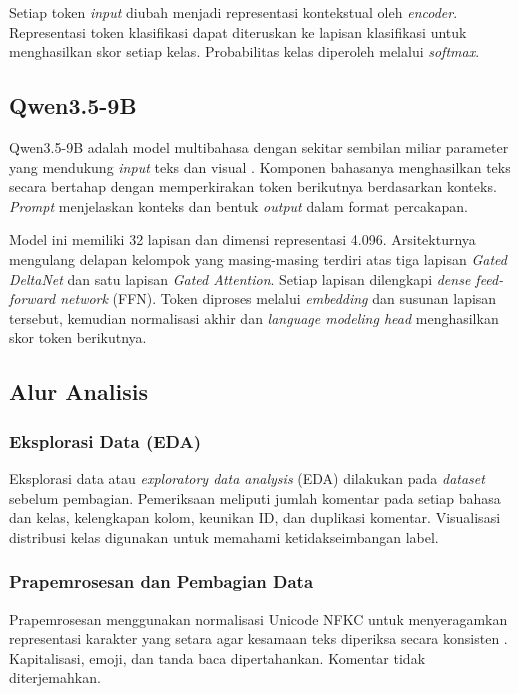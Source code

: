 \documentclass[11pt]{article}
\begin{document}
Setiap token \textit{input} diubah menjadi representasi kontekstual oleh \textit{encoder}. Representasi token klasifikasi dapat diteruskan ke lapisan klasifikasi untuk menghasilkan skor setiap kelas. Probabilitas kelas diperoleh melalui \textit{softmax}.

\subsection{Qwen3.5-9B}
\label{subsec:qwen}

Qwen3.5-9B adalah model multibahasa dengan sekitar sembilan miliar parameter yang mendukung \textit{input} teks dan visual \citep{qwen-team-2026-qwen35}. Komponen bahasanya menghasilkan teks secara bertahap dengan memperkirakan token berikutnya berdasarkan konteks. \textit{Prompt} menjelaskan konteks dan bentuk \textit{output} dalam format percakapan.

Model ini memiliki 32 lapisan dan dimensi representasi 4.096. Arsitekturnya mengulang delapan kelompok yang masing-masing terdiri atas tiga lapisan \textit{Gated DeltaNet} dan satu lapisan \textit{Gated Attention}. Setiap lapisan dilengkapi \textit{dense feed-forward network} (FFN). Token diproses melalui \textit{embedding} dan susunan lapisan tersebut, kemudian normalisasi akhir dan \textit{language modeling head} menghasilkan skor token berikutnya.

\subsection{Alur Analisis}

\subsubsection{Eksplorasi Data (EDA)}
Eksplorasi data atau \textit{exploratory data analysis} (EDA) dilakukan pada \textit{dataset} sebelum pembagian. Pemeriksaan meliputi jumlah komentar pada setiap bahasa dan kelas, kelengkapan kolom, keunikan ID, dan duplikasi komentar. Visualisasi distribusi kelas digunakan untuk memahami ketidakseimbangan label.

\subsubsection{Prapemrosesan dan Pembagian Data}
Prapemrosesan menggunakan normalisasi Unicode NFKC untuk menyeragamkan representasi karakter yang setara agar kesamaan teks diperiksa secara konsisten \citep{unicode-consortium-2026-normalization}. Kapitalisasi, emoji, dan tanda baca dipertahankan. Komentar tidak diterjemahkan.
\end{document}
